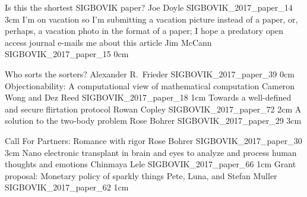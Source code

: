 
\addpaper
	{Is this the shortest SIGBOVIK paper?}
	{Joe Doyle}
	{}
	{SIGBOVIK_2017_paper_14}
	{3cm}
	{}
\addpaper
	{I'm on vacation so I'm submitting a vacation picture instead of a paper, or, perhaps, a vacation photo in the format of a paper; I hope a predatory open access journal e-mails me about this article}
	{Jim McCann}
	{}
	{SIGBOVIK_2017_paper_15}
	{0cm}
	{}

\addpaper
	{Who sorts the sorters?}
	{Alexander R.\ Frieder}
	{}
	{SIGBOVIK_2017_paper_39}
	{0cm}
	{}
\addpaper
	{Objectionability: A computational view of mathematical computation}
	{Cameron Wong and Dez Reed}
	{}
	{SIGBOVIK_2017_paper_18}
	{1cm}
	{}
\addpaper
	{Towards a well-defined and secure flirtation protocol}
	{Rowan Copley}
	{}
	{SIGBOVIK_2017_paper_72}
	{2cm}
	{}
\addpaper
	{A solution to the two-body problem}
	{Rose Bohrer}
	{}
	{SIGBOVIK_2017_paper_29}
	{3cm}
	{}

\addpaper
	{Call For Partners: Romance with rigor}
	{Rose Bohrer}
	{}
	{SIGBOVIK_2017_paper_30}
	{3cm}
	{}
\addpaper
	{Nano electronic transplant in brain and eyes to analyze and process human thoughts and emotions}
	{Chinmaya Lele}
	{}
	{SIGBOVIK_2017_paper_66}
	{1cm}
	{}
\addpaper
	{Grant proposal: Monetary policy of sparkly things}
	{Pete, Luna, and Stefan Muller}
	{}
	{SIGBOVIK_2017_paper_62}
	{1cm}
	{}

